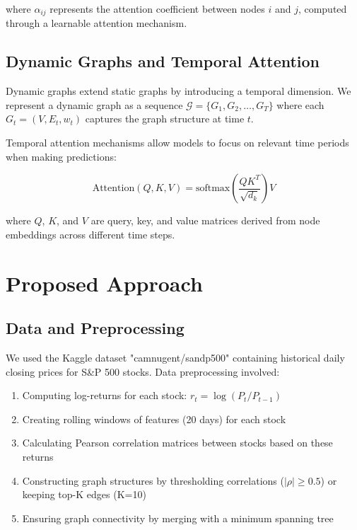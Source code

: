 \documentclass[12pt]{article}
\begin{document}
where $\alpha_{ij}$ represents the attention coefficient between nodes $i$ and $j$, computed through a learnable attention mechanism.

\subsection{Dynamic Graphs and Temporal Attention}

Dynamic graphs extend static graphs by introducing a temporal dimension. We represent a dynamic graph as a sequence $\mathcal{G} = \{G_1, G_2, \ldots, G_T\}$ where each $G_t = (V, E_t, w_t)$ captures the graph structure at time $t$.

Temporal attention mechanisms allow models to focus on relevant time periods when making predictions:

\begin{equation}
\text{Attention}(Q, K, V) = \text{softmax}\left(\frac{QK^T}{\sqrt{d_k}}\right)V
\end{equation}

where $Q$, $K$, and $V$ are query, key, and value matrices derived from node embeddings across different time steps.

\section{Proposed Approach}

\subsection{Data and Preprocessing}

We used the Kaggle dataset "camnugent/sandp500" containing historical daily closing prices for S\&P 500 stocks. Data preprocessing involved:

\begin{enumerate}
    \item Computing log-returns for each stock: $r_t = \log(P_t / P_{t-1})$
    \item Creating rolling windows of features (20 days) for each stock
    \item Calculating Pearson correlation matrices between stocks based on these returns
    \item Constructing graph structures by thresholding correlations ($|\rho| \geq 0.5$) or keeping top-K edges (K=10)
    \item Ensuring graph connectivity by merging with a minimum spanning tree
\end{enumerate}
\end{document}

